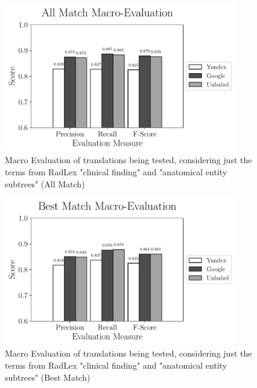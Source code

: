 \begin{figure}
	\centering
	\includegraphics[width=0.9\textwidth]{SupportFiles/plots/all_match_macro_clinical_anatomical_subtrees_plot.pdf}
	\caption{Macro Evaluation of translations being tested, considering just the terms from RadLex "clinical finding" and "anatomical entity subtrees" (All Match)}
	\label{app:macro_eval_subtrees_all}
\end{figure}


\begin{figure}
	\centering
	\includegraphics[width=0.9\textwidth]{SupportFiles/plots/best_match_macro_clinical_anatomical_subtrees_plot.pdf}
	\caption{Macro Evaluation of translations being tested, considering just the terms from RadLex "clinical finding" and "anatomical entity subtrees" (Best Match)}
	\label{app:macro_eval_subtrees_best}
\end{figure}


